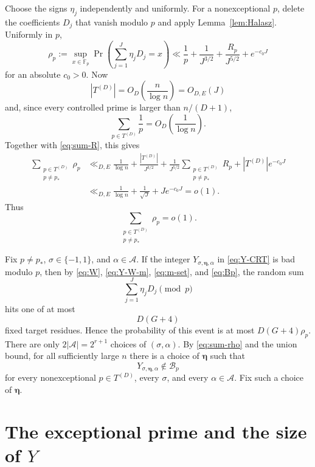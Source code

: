 \documentclass[11pt]{article}
\newcommand{\F}{\mathbb F}
\begin{document}
Choose the signs $\eta_j$ independently and uniformly. For a nonexceptional $p$, delete the coefficients $D_j$ that vanish modulo $p$ and apply Lemma~\ref{lem:Halasz}. Uniformly in $p$,
\[
  \rho_p
  :=\sup_{x\in\F_p}
       \Pr\left(\sum_{j=1}^{J}\eta_jD_j=x\right)
  \ll
  \frac1p+\frac1{J^{3/2}}+\frac{R_p}{J^{5/2}}+e^{-c_0J}
\]
for an absolute $c_0>0$. Now
\[
  |T^{(D)}|=O_D\!\left(\frac n{\log n}\right)=O_{D,E}(J)
\]
and, since every controlled prime is larger than $n/(D+1)$,
\[
  \sum_{p\in T^{(D)}}\frac1p=O_D\!\left(\frac1{\log n}\right).
\]
Together with \eqref{eq:sum-R}, this gives
\begin{align*}
  \sum_{\substack{p\in T^{(D)}\\p\neq p_*}}\rho_p
  &\ll_{D,E}
    \frac1{\log n}
    +\frac{|T^{(D)}|}{J^{3/2}}
    +\frac{1}{J^{5/2}}
       \sum_{\substack{p\in T^{(D)}\\p\neq p_*}}R_p
    +|T^{(D)}|e^{-c_0J}\\
  &\ll_{D,E}
    \frac1{\log n}+\frac1{\sqrt J}+Je^{-c_0J}
   =o(1).
\end{align*}
Thus
\begin{equation}\label{eq:sum-rho}
  \sum_{\substack{p\in T^{(D)}\\p\neq p_*}}\rho_p=o(1).
\end{equation}

Fix $p\neq p_*$, $\sigma\in\{-1,1\}$, and $\alpha\in\mathcal A$. If the integer $Y_{\sigma,\boldsymbol\eta,\alpha}$ in \eqref{eq:Y-CRT} is bad modulo $p$, then by \eqref{eq:W}, \eqref{eq:Y-W-m}, \eqref{eq:m-set}, and \eqref{eq:Bp}, the random sum
\[
  \sum_{j=1}^{J}\eta_jD_j\pmod p
\]
hits one of at most
\[
  D(G+4)
\]
fixed target residues. Hence the probability of this event is at most $D(G+4)\rho_p$. There are only $2|\mathcal A|=2^{r+1}$ choices of $(\sigma,\alpha)$. By \eqref{eq:sum-rho} and the union bound, for all sufficiently large $n$ there is a choice of $\boldsymbol\eta$ such that
\begin{equation}\label{eq:all-nonexceptional-good}
  Y_{\sigma,\boldsymbol\eta,\alpha}\notin\mathcal B_p
\end{equation}
for every nonexceptional $p\in T^{(D)}$, every $\sigma$, and every $\alpha\in\mathcal A$. Fix such a choice of $\boldsymbol\eta$.

\section{The exceptional prime and the size of \texorpdfstring{$Y$}{Y}}
\end{document}
